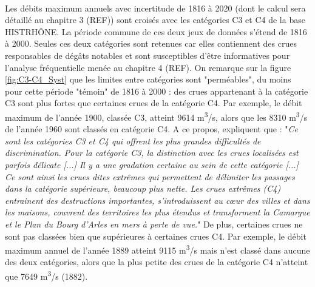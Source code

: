 \documentclass[11pt]{article}
\begin{document}
	\paragraph{} Les débits maximum annuels avec incertitude de 1816 à 2020 (dont le calcul sera détaillé au chapitre 3 (REF)) sont croisés avec les catégories C3 et C4 de la base HISTRHÔNE. La période commune de ces deux jeux de données s'étend de 1816 à 2000. Seules ces deux catégories sont retenues car elles contiennent des crues responsables de dégâts notables et sont susceptibles d'être informatives pour l'analyse fréquentielle menée au chapitre 4 (REF). On remarque sur la figure \ref{fig:C3-C4_Syst} que les limites entre catégories sont "perméables", du moins pour cette période "témoin" de 1816 à 2000 : des crues appartenant à la catégorie C3 sont plus fortes que certaines crues de la catégorie C4. Par exemple, le débit maximum de l'année 1900, classée C3, atteint 9614 m\textsuperscript{3}/s, alors que les 8310 m\textsuperscript{3}/s de l'année 1960 sont classés en catégorie C4. A ce propos, \citet{pichard_sept_2014} expliquent que : "\textit{Ce sont les catégories C3 et C4 qui offrent les plus grandes difficultés de discrimination. Pour la catégorie C3, la distinction avec les crues localisées est parfois délicate [...] Il y a une gradation certaine au sein de cette catégorie [...] Ce sont ainsi les crues dites extrêmes qui permettent de délimiter les passages dans la catégorie supérieure, beaucoup plus nette. Les crues extrêmes (C4) entrainent des destructions importantes, s'introduissent au cœur des villes et dans les maisons, couvrent des territoires les plus étendus et transforment la Camargue et le Plan du Bourg d'Arles en mers à perte de vue.}" De plus, certaines crues ne sont pas classées bien que supérieures à certaines crues C4. Par exemple, le débit maximum annuel de l'année 1889 atteint 9115 m\textsuperscript{3}/s mais n'est classé dans aucune des deux catégories, alors que la plus petite des crues de la catégorie C4 n'atteint que 7649 m\textsuperscript{3}/s (1882). 
	
\end{document}

